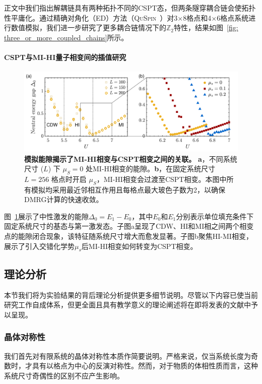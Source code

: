 \documentclass[preprint,superscriptaddress,floatfix, nofootinbib]{revtex4-2}
\begin{document}
\begin{CJK*}{UTF8}{gbsn}
正文中我们指出解耦链具有两种拓扑不同的CSPT态，但两条隧穿耦合链会使拓扑性平庸化。通过精确对角化（ED）方法（\textsc{QuSpin}~\cite{QuSpin}）对3×8格点和4×6格点系统进行数值模拟，我们进一步研究了更多耦合链情况下的$\mathbb{Z}_2$特性，结果如图~\ref{fig: three_or_more_coupled_chains}所示。

\paragraph*{CSPT与MI-HI量子相变间的插值研究}

\begin{figure}
    \centering
    \includegraphics[width=\textwidth]{figures/HI_to_CSPT_transition_large_size.pdf}
    \caption{\textbf{模拟能隙揭示了MI-HI相变与CSPT相变之间的关联。} \textbf{a}，不同系统尺寸 ($L$) 下 $\mu_S=0$ 处MI-HI相变的能隙。\textbf{b}，在固定系统尺寸 $L=256$ 格点时开启 $\mu_S$，MI-HI相变会过渡至CSPT相变。本图中所有模拟均采用最近邻相互作用且每格点最大玻色子数为2，以确保DMRG计算的快速收敛。
    }
    \label{fig: HI_to_CSPT_transition_large_size}
\end{figure}

图~\ref{fig: HI_to_CSPT_transition_large_size}展示了中性激发的能隙$\Delta_0=E_1-E_0$，其中$E_0$和$E_1$分别表示单位填充条件下固定系统尺寸的基态与第一激发态。子图a呈现了CDW、HI和MI相之间两个相变点的能隙闭合现象，该特征随系统尺寸增大而愈发显著。子图b聚焦HI-MI相变，展示了引入交错化学势$\mu_s$后MI-HI相变如何转变为CSPT相变。
\subsection*{理论分析}

本节我们将为实验结果的背后理论分析提供更多细节说明。尽管以下内容已使当前研究工作自成体系，但更全面且具有教学意义的理论阐述将在即将发表的文献\cite{Sahay2025}中予以呈现。
\subsubsection*{晶体对称性}
我们首先对有限系统的晶体对称性本质作简要说明。严格来说，仅当系统长度为奇数时，才具有以格点为中心的反演对称性。然而，对于物质的体相性质而言，这种系统尺寸奇偶性的区别不应产生影响。

\end{CJK*}
\end{document}
